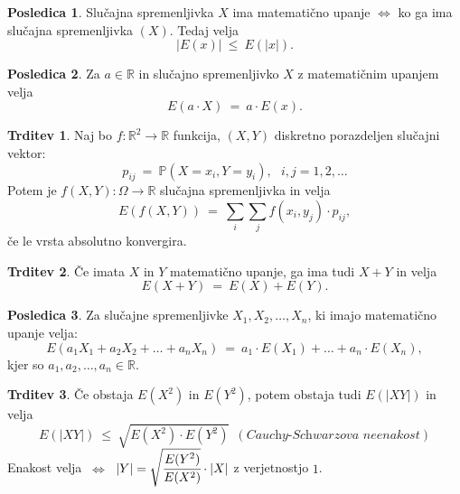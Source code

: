 \documentclass[11pt]{article}
\theoremstyle{definition}
\theoremstyle{definition}
\newtheorem{trditev}{Trditev}[section]
\theoremstyle{definition}
\newtheorem*{posledica}{Posledica}
\begin{document}
\begin{posledica}

Slučajna spremenljivka $X$ ima matematično upanje $\Leftrightarrow$ ko ga ima slučajna spremenljivka $(X)$. Tedaj velja
$$|E(x)| ~\leq~ E(|x|).$$

\end{posledica}
\vspace{0.5cm}

\begin{posledica}

Za $a \in \mathbb{R}$ in slučajno spremenljivko $X$ z matematičnim upanjem velja
$$E(a \cdot X) ~=~ a \cdot E(x).$$ 

\end{posledica}
\vspace{0.5cm}

\begin{trditev}

Naj bo $f: \mathbb{R}^2 \rightarrow \mathbb{R}$ funkcija, $(X, Y)$ diskretno porazdeljen slučajni vektor:
$$p_{ij} ~=~ \mathbb{P}(X = x_i, Y = y_i), ~~~i,j = 1, 2, \ldots$$
Potem je $f(X, Y): \Omega \rightarrow \mathbb{R}$ slučajna spremenljivka in velja
$$E(f(X, Y)) ~=~ \sum_i \sum_j f(x_i, y_j) \cdot p_{ij},$$
če le vrsta absolutno konvergira.

\end{trditev}
\vspace{0.5cm}

\begin{trditev}

Če imata $X$ in $Y$ matematično upanje, ga ima tudi $X + Y$ in velja
$$E(X + Y) ~=~ E(X) + E(Y).$$

\end{trditev}
\vspace{0.5cm}

\begin{posledica}

Za slučajne spremenljivke $X_1, X_2, \ldots, X_n$, ki imajo matematično upanje velja:
$$E(a_1 X_1 + a_2 X_2 + \ldots + a_n X_n) ~=~ a_1 \cdot E(X_1) + \ldots + a_n \cdot E(X_n),$$
kjer so $a_1, a_2, \ldots, a_n \in \mathbb{R}$.

\end{posledica}
\vspace{0.5cm}

\begin{trditev}

Če obstaja $E(X^2)$ in $E(Y^2)$, potem obstaja tudi $E(|XY|)$ in velja
$$E(|XY|) ~\leq~ \sqrt{E(X^2) \cdot E(Y^2)} ~~(\textit{Cauchy-Schwarzova neenakost})$$
Enakost velja $~\Leftrightarrow~$ $|Y| = \sqrt{\cfrac{E(Y^2)}{E(X^2)}} \cdot |X|$ z verjetnostjo $1$.

\end{trditev}
\vspace{0.5cm}
\end{document}
